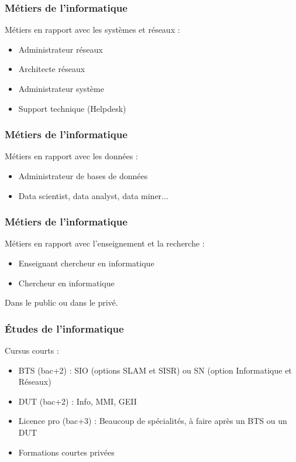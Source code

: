 \documentclass{beamer}
\begin{document}
\begin{frame}
    \frametitle{Métiers de l'informatique}
    Métiers en rapport avec les systèmes et réseaux :
        \begin{itemize}
            \item Administrateur réseaux
            \item Architecte réseaux
            \item Administrateur système
            \item Support technique (Helpdesk)
        \end{itemize}
\end{frame}

\begin{frame}
    \frametitle{Métiers de l'informatique}
    Métiers en rapport avec les données :
        \begin{itemize}
            \item Administrateur de bases de données
            \item Data scientist, data analyst, data miner...
        \end{itemize}
\end{frame}

\begin{frame}
    \frametitle{Métiers de l'informatique}
    Métiers en rapport avec l'enseignement et la recherche :
        \begin{itemize}
            \item Enseignant chercheur en informatique
            \item Chercheur en informatique
        \end{itemize}
    
    Dans le public ou dans le privé.
\end{frame}

\begin{frame}
    \frametitle{Études de l'informatique}
    Cursus courts :
        \begin{itemize}
            \item BTS (bac+2) : SIO (options SLAM et SISR) ou SN (option Informatique et Réseaux)
            \item DUT (bac+2) : Info, MMI, GEII
            \item Licence pro (bac+3) : Beaucoup de spécialités, à faire après un BTS ou un DUT
            \item Formations courtes privées
        \end{itemize}
\end{frame}
\end{document}
